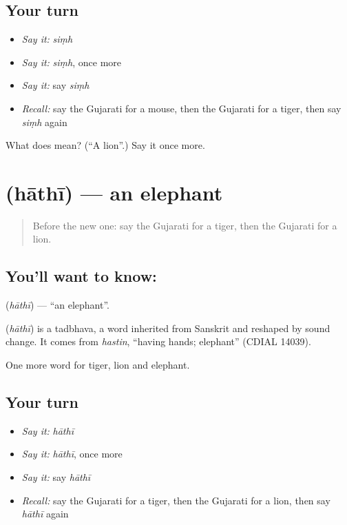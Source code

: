 \subsection*{Your turn}
\begin{itemize}
\raggedright
  \item \emph{Say it:} \emph{siṃh}
  \item \emph{Say it:} \emph{siṃh}, once more
  \item \emph{Say it:} say \emph{siṃh}
  \item \emph{Recall:} say the Gujarati for a mouse, then the Gujarati for a tiger, then say \emph{siṃh} again
\end{itemize}

\begin{tcolorbox}[breakable,colback=teal!4,colframe=teal!35!black,title={Before you move on}]
What does  mean? (\textquotedblleft{}A lion\textquotedblright{}.) Say it once more.
\end{tcolorbox}
\section[\texorpdfstring{\gu{હાથી} (hāthī)}{હાથી (hāthī)}]{ (hāthī) — an elephant}

\label{lesson:GU-C68-elephant}



\begin{quote}
Before the new one: say the Gujarati for a tiger, then the Gujarati for a lion.
\end{quote}

\subsection*{You'll want to know: }
\textbf{} (\emph{hāthī}) — \textquotedblleft{}an elephant\textquotedblright{}.

\begin{cousinweb}
\textbf{} (\emph{hāthī}) is a tadbhava, a word inherited from Sanskrit and reshaped by sound change. It comes from \emph{hastin}, \textquotedblleft{}having hands; elephant\textquotedblright{} (CDIAL 14039).
\end{cousinweb}

\begin{grammarlens}[title={What you've built}]
One more word for tiger, lion and elephant.
\end{grammarlens}

\subsection*{Your turn}
\begin{itemize}
\raggedright
  \item \emph{Say it:} \emph{hāthī}
  \item \emph{Say it:} \emph{hāthī}, once more
  \item \emph{Say it:} say \emph{hāthī}
  \item \emph{Recall:} say the Gujarati for a tiger, then the Gujarati for a lion, then say \emph{hāthī} again
\end{itemize}

